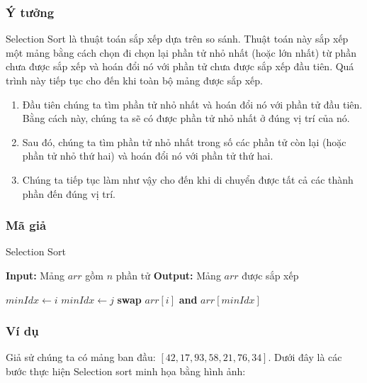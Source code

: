 \subsubsection{Ý tưởng}
Selection Sort là thuật toán sắp xếp dựa trên so sánh. Thuật toán này sắp xếp một mảng bằng cách chọn đi chọn lại phần tử nhỏ nhất (hoặc lớn nhất) từ phần chưa được sắp xếp và hoán đổi nó với phần tử chưa được sắp xếp đầu tiên. Quá trình này tiếp tục cho đến khi toàn bộ mảng được sắp xếp.
\begin{enumerate}
    \item Đầu tiên chúng ta tìm phần tử nhỏ nhất và hoán đổi nó với phần tử đầu tiên. 
    Bằng cách này, chúng ta sẽ có được phần tử nhỏ nhất ở đúng vị trí của nó.
    
    \item Sau đó, chúng ta tìm phần tử nhỏ nhất trong số các phần tử còn lại 
    (hoặc phần tử nhỏ thứ hai) và hoán đổi nó với phần tử thứ hai.
    
    \item Chúng ta tiếp tục làm như vậy cho đến khi di chuyển được tất cả các thành phần đến đúng vị trí.
\end{enumerate}
\subsubsection{Mã giả}

\begin{algorithm}[H]
    \caption{Selection Sort}
    \begin{algorithmic}[1]
        \State \textbf{Input:} Mảng $arr$ gồm $n$ phần tử
        \State \textbf{Output:} Mảng $arr$ được sắp xếp
        
            \State $minIdx \gets i$
                    \State $minIdx \gets j$
                \EndIf
            \EndFor
                \State \textbf{swap} $arr[i]$ \textbf{and} $arr[minIdx]$
            \EndIf
        \EndFor
    \EndProcedure
    \end{algorithmic}
    
\end{algorithm}
\newpage
\subsubsection{Ví dụ}
Giả sử chúng ta có mảng ban đầu: $[42, 17, 93, 58, 21, 76, 34]$. Dưới đây là các bước thực hiện Selection sort minh họa bằng hình ảnh:

